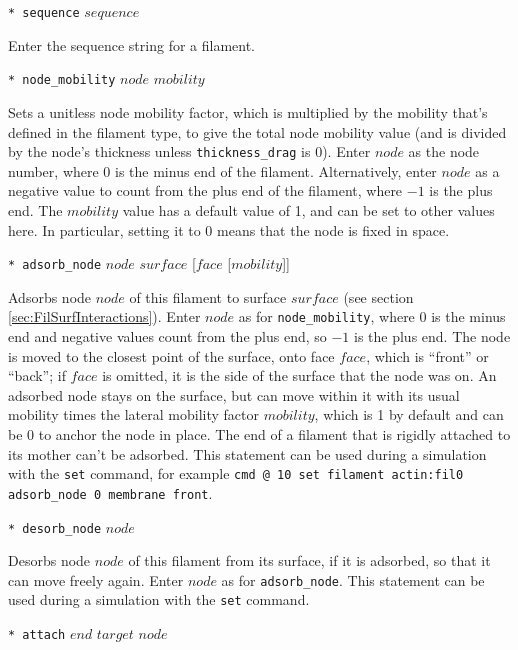 \documentclass {scrbook}
\newcommand {\ttt} {\texttt}
\begin{document}
\begin{description}
\item{\ttt{* sequence} $sequence$}

Enter the sequence string for a filament.

\item{\ttt{* node\_mobility} $node$ $mobility$}

Sets a unitless node mobility factor, which is multiplied by the mobility that's defined in the filament type, to give the total node mobility value (and is divided by the node's thickness unless \ttt{thickness\_drag} is 0). Enter $node$ as the node number, where 0 is the minus end of the filament. Alternatively, enter $node$ as a negative value to count from the plus end of the filament, where $-1$ is the plus end. The $mobility$ value has a default value of 1, and can be set to other values here. In particular, setting it to 0 means that the node is fixed in space.

\item{\ttt{* adsorb\_node} $node$ $surface$ [$face$ [$mobility$]]}

Adsorbs node $node$ of this filament to surface $surface$ (see section \ref{sec:FilSurfInteractions}). Enter $node$ as for \ttt{node\_mobility}, where 0 is the minus end and negative values count from the plus end, so $-1$ is the plus end. The node is moved to the closest point of the surface, onto face $face$, which is ``front'' or ``back''; if $face$ is omitted, it is the side of the surface that the node was on. An adsorbed node stays on the surface, but can move within it with its usual mobility times the lateral mobility factor $mobility$, which is 1 by default and can be 0 to anchor the node in place. The end of a filament that is rigidly attached to its mother can't be adsorbed. This statement can be used during a simulation with the \ttt{set} command, for example \ttt{cmd @ 10 set filament actin:fil0 adsorb\_node 0 membrane front}.

\item{\ttt{* desorb\_node} $node$}

Desorbs node $node$ of this filament from its surface, if it is adsorbed, so that it can move freely again. Enter $node$ as for \ttt{adsorb\_node}. This statement can be used during a simulation with the \ttt{set} command.

\item{\ttt{* attach} $end$ $target$ $node$}


\end{description}
\end{document}
